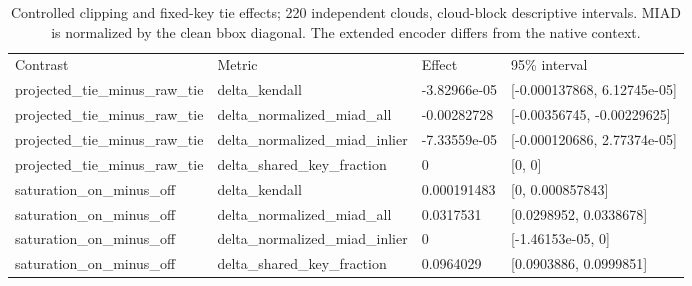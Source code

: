 \begin{table}[tbp]\centering\scriptsize
\caption{Controlled clipping and fixed-key tie effects; 220 independent clouds, cloud-block descriptive intervals. MIAD is normalized by the clean bbox diagonal. The extended encoder differs from the native context.}
\begin{tabular}{llll}
\hline
Contrast & Metric & Effect & 95\% interval \\
projected\_tie\_minus\_raw\_tie & delta\_kendall & -3.82966e-05 & [-0.000137868, 6.12745e-05] \\
projected\_tie\_minus\_raw\_tie & delta\_normalized\_miad\_all & -0.00282728 & [-0.00356745, -0.00229625] \\
projected\_tie\_minus\_raw\_tie & delta\_normalized\_miad\_inlier & -7.33559e-05 & [-0.000120686, 2.77374e-05] \\
projected\_tie\_minus\_raw\_tie & delta\_shared\_key\_fraction & 0 & [0, 0] \\
saturation\_on\_minus\_off & delta\_kendall & 0.000191483 & [0, 0.000857843] \\
saturation\_on\_minus\_off & delta\_normalized\_miad\_all & 0.0317531 & [0.0298952, 0.0338678] \\
saturation\_on\_minus\_off & delta\_normalized\_miad\_inlier & 0 & [-1.46153e-05, 0] \\
saturation\_on\_minus\_off & delta\_shared\_key\_fraction & 0.0964029 & [0.0903886, 0.0999851] \\
\hline
\end{tabular}
\end{table}
